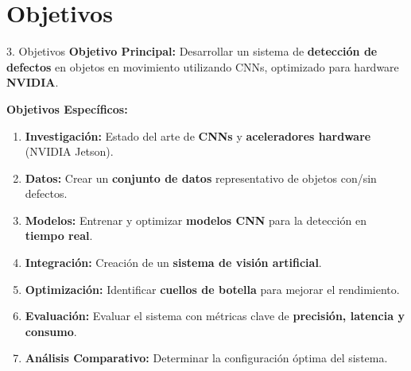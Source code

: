 \documentclass[spanish]{beamer}
\begin{document}

\section{Objetivos}
\begin{frame}{3. Objetivos}
    \textbf{Objetivo Principal:} Desarrollar un sistema de \textbf{detección de defectos} en objetos en movimiento utilizando CNNs, optimizado para hardware \textbf{NVIDIA}.

        \textbf{Objetivos Específicos:}
        \begin{enumerate}
            \item \textbf{Investigación:} Estado del arte de \textbf{CNNs} y \textbf{aceleradores hardware} (NVIDIA Jetson).
            \item \textbf{Datos:} Crear un \textbf{conjunto de datos} representativo de objetos con/sin defectos.
            \item \textbf{Modelos:} Entrenar y optimizar \textbf{modelos CNN} para la detección en \textbf{tiempo real}.
            \item \textbf{Integración:} Creación de un \textbf{sistema de visión artificial}.
            \item \textbf{Optimización:} Identificar \textbf{cuellos de botella} para mejorar el rendimiento.
            \item \textbf{Evaluación:} Evaluar el sistema con métricas clave de \textbf{precisión, latencia y consumo}.
            \item \textbf{Análisis Comparativo:} Determinar la configuración óptima del sistema.
        \end{enumerate}
\end{frame}
\end{document}
